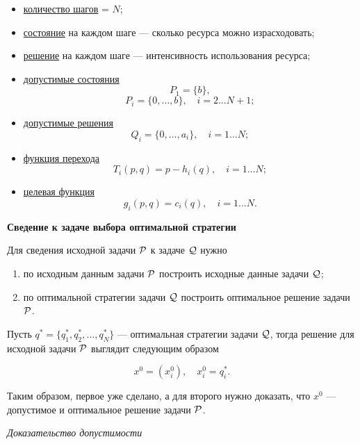 \begin{itemize}[nosep]
	\item \underline{количество шагов} = $N$;
	
	\item \underline{состояние} на каждом шаге --- сколько ресурса можно израсходовать;
	
	\item \underline{решение} на каждом шаге --- интенсивность использования ресурса;
	
	\item \underline{допустимые состояния}
	\[
	P_1 = \{b\},
	\]
	\[
	P_i = \{0, \dots, b\}, \quad i = 2 \dots N+1;
	\]
	
	\item \underline{допустимые решения}
	\[
	Q_i = \{0, \dots, a_i\}, \quad i = 1 \dots N;
	\]
	
	\item \underline{функция перехода}
	\[
	T_i(p, q) = p - h_i(q), \quad i = 1 \dots N;
	\]
	
	\item \underline{целевая функция}
	\[
	g_i(p, q) = c_i(q), \quad i = 1 \dots N.
	\]
\end{itemize}

\bigskip

\textbf{Сведение к задаче выбора оптимальной стратегии}

Для сведения исходной задачи $\P$ к задаче $\Q$ нужно

\begin{enumerate}[nosep]
	\item по исходным данным задачи $\P$ построить исходные данные задачи $\Q$;
	
	\item по оптимальной стратегии задачи $\Q$ построить оптимальное решение задачи $\P$.
\end{enumerate}

Пусть $q^* = \{q_1^*, q_2^*, \dots, q_N^*\}$ --- оптимальная стратегии задачи $\Q$, тогда решение для исходной задачи $\P$ выглядит следующим образом

\[
x^0 = (x_i^0), \quad x_i^0 = q_i^*.
\]

Таким образом, первое уже сделано, а для второго нужно доказать, что $x^0$ --- допустимое и оптимальное решение задачи $\P$.

\bigskip

\textit{Доказательство допустимости}

